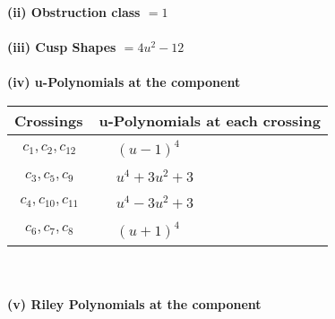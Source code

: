 \documentclass[1p]{elsarticle_modified}
\theoremstyle{definition}
\begin{document}
\flushleft \textbf{(ii) Obstruction class $= 1$}\\~\\
\flushleft \textbf{(iii) Cusp Shapes $= 4 u^2-12$}\\~\\
\newpage\renewcommand{\arraystretch}{1}
\flushleft \textbf{(iv) u-Polynomials at the component}\newline \\
\begin{tabular}{m{50pt}|m{274pt}}
Crossings & \hspace{64pt}u-Polynomials at each crossing \\
\hline $$\begin{aligned}c_{1},c_{2},c_{12}\end{aligned}$$&$\begin{aligned}
&(u-1)^4
\end{aligned}$\\
\hline $$\begin{aligned}c_{3},c_{5},c_{9}\end{aligned}$$&$\begin{aligned}
&u^4+3 u^2+3
\end{aligned}$\\
\hline $$\begin{aligned}c_{4},c_{10},c_{11}\end{aligned}$$&$\begin{aligned}
&u^4-3 u^2+3
\end{aligned}$\\
\hline $$\begin{aligned}c_{6},c_{7},c_{8}\end{aligned}$$&$\begin{aligned}
&(u+1)^4
\end{aligned}$\\
\hline
\end{tabular}\\~\\
\newpage\renewcommand{\arraystretch}{1}
\flushleft \textbf{(v) Riley Polynomials at the component}\newline \\
\end{document}
